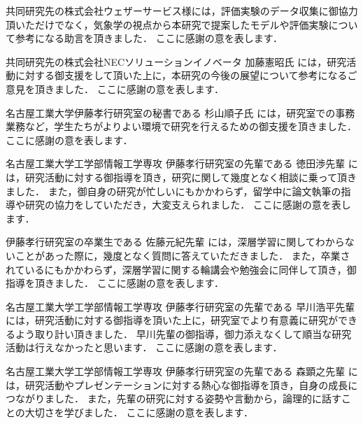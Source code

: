 共同研究先の株式会社ウェザーサービス様には，評価実験のデータ収集に御協力頂いただけでなく，気象学の視点から本研究で提案したモデルや評価実験について参考になる助言を頂きました．
ここに感謝の意を表します． \par
\vspace{0.5cm}

共同研究先の株式会社NECソリューションイノベータ 加藤憲昭氏 には，研究活動に対する御支援をして頂いた上に，本研究の今後の展望について参考になるご意見を頂きました．
ここに感謝の意を表します． \par
\vspace{0.5cm}

名古屋工業大学伊藤孝行研究室の秘書である 杉山順子氏 には，研究室での事務業務など，学生たちがよりよい環境で研究を行えるための御支援を頂きました．
ここに感謝の意を表します． \par
\vspace{0.5cm}

名古屋工業大学工学部情報工学専攻 伊藤孝行研究室の先輩である 徳田渉先輩 には，研究活動に対する御指導を頂き，研究に関して幾度となく相談に乗って頂きました．
また，御自身の研究が忙しいにもかかわらず，留学中に論文執筆の指導や研究の協力をしていただき，大変支えられました．
ここに感謝の意を表します． \par
\vspace{0.5cm}

伊藤孝行研究室の卒業生である 佐藤元紀先輩 には，深層学習に関してわからないことがあった際に，幾度となく質問に答えていただきました．
また，卒業されているにもかかわらず，深層学習に関する輪講会や勉強会に同伴して頂き，御指導を頂きました．
ここに感謝の意を表します． \par
\vspace{0.5cm}

名古屋工業大学工学部情報工学専攻 伊藤孝行研究室の先輩である 早川浩平先輩 には，研究活動に対する御指導を頂いた上に，研究室でより有意義に研究ができるよう取り計い頂きました．
早川先輩の御指導，御力添えなくして順当な研究活動は行えなかったと思います．
ここに感謝の意を表します． \par
\vspace{0.5cm}

名古屋工業大学工学部情報工学専攻 伊藤孝行研究室の先輩である 森顕之先輩 には，研究活動やプレゼンテーションに対する熱心な御指導を頂き，自身の成長につながりました．
また，先輩の研究に対する姿勢や言動から，論理的に話すことの大切さを学びました．
ここに感謝の意を表します． \par
\vspace{0.5cm}

